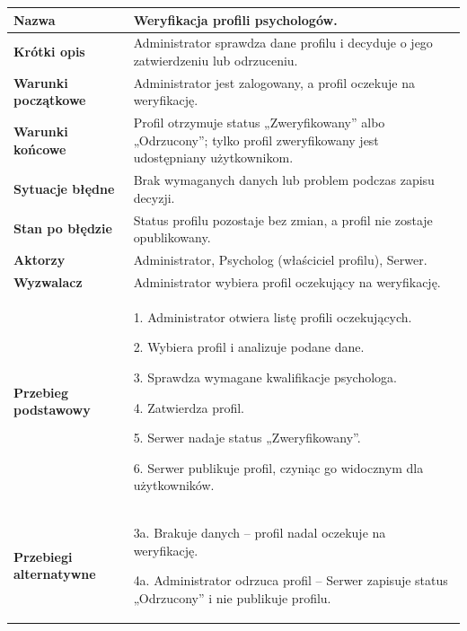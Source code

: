 \documentclass[11pt,a4paper]{article}
\newcommand{\pole}[2]{
\textbf{#1} & #2 \\ \hline
}
\begin{document}
\begin{tabularx}{\textwidth}{|p{3.9cm}|Y|}
\hline

\pole{Nazwa}{
Weryfikacja profili psychologów.
}

\pole{Krótki opis}{
Administrator sprawdza dane profilu
i decyduje o jego zatwierdzeniu
lub odrzuceniu.
}

\pole{Warunki początkowe}{
Administrator jest zalogowany, a profil oczekuje
na weryfikację.
}

\pole{Warunki końcowe}{
Profil otrzymuje status „Zweryfikowany”
albo „Odrzucony”; tylko profil
zweryfikowany jest udostępniany użytkownikom.
}

\pole{Sytuacje błędne}{
Brak wymaganych danych
lub problem podczas zapisu decyzji.
}

\pole{Stan po błędzie}{
Status profilu pozostaje bez zmian,
a profil nie zostaje opublikowany.
}

\pole{Aktorzy}{
Administrator,
Psycholog (właściciel profilu),
Serwer.
}

\pole{Wyzwalacz}{
Administrator wybiera profil oczekujący na weryfikację.
}

\pole{Przebieg podstawowy}{
1. Administrator otwiera listę
profili oczekujących.\par
2. Wybiera profil i analizuje podane dane.\par
3. Sprawdza wymagane kwalifikacje psychologa.\par
4. Zatwierdza profil.\par
5. Serwer nadaje status „Zweryfikowany”.\par
6. Serwer publikuje profil, czyniąc go widocznym dla użytkowników.
}

\pole{Przebiegi alternatywne}{
3a. Brakuje danych --
profil nadal oczekuje na weryfikację.\par
4a. Administrator odrzuca profil --
Serwer zapisuje status „Odrzucony”
i nie publikuje profilu.
}

\end{tabularx}
\endgroup
\end{document}
